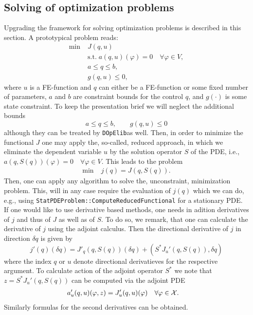 \documentclass[prodmode,acmtoms]{acmsmall}
\numberwithin{equation}{section}
\renewcommand{\phi}{\varphi}
\newcommand{\dope}{\texttt{DOpElib}}
\begin{document}
\subsection{Solving of optimization problems}\label{sec:opt}
Upgrading the framework for solving optimization problems
is described in this section. A prototypical problem reads:
\begin{align*}
\min\;&J(q,u) \\
  &\text{s.t.}\; a(q,u)(\phi) = 0 \quad \forall \phi\in V,\\
  &a \le q \le b,\\
  &g(q,u) \le 0,  
\end{align*}
where $u$ is a FE-function and $q$ can either be a FE-function or some 
fixed number of parameters, $a$ and $b$ are constraint bounds for the control $q$,
and $g(\cdot)$ is some state constraint.
To keep the presentation brief we will neglect the additional bounds
\[
a \le q \le b,\qquad g(q,u) \le 0
\]
although they can be treated by \dope as well.
Then, in order to minimize the functional $J$ one may apply the, so-called, 
reduced approach, in which we eliminate the dependent variable $u$ by the solution 
operator $S$ of the PDE, i.e., $a(q,S(q))(\phi) = 0 \quad \forall \phi\in V$. 
This leads to the problem
\begin{align*}
\min\;&j(q) = J(q,S(q)). 
\end{align*}
Then, one can apply any algorithm to solve the, unconstraint, minimization 
problem. This, will in any case require the evaluation of $j(q)$ which 
we can do, e.g., using \texttt{StatPDEProblem::ComputeReducedFunctional} for 
a stationary PDE. If one would like to use derivative based methods, one 
needs in adition derivatives of $j$ and thus of $J$ as well as of $S$. 
To do so, we remark, that one can calculate the derivative of 
$j$ using the adjoint calculus. Then the directional derivative 
of $j$ in direction $\delta q$ is given by
\[
j'(q)(\delta q) = J'_q(q,S(q))(\delta q) + (S^* J_u'(q,S(q)),\delta q)
\]
where the index $q$ or $u$ denote directional derivatieves for the 
respective argument. To calculate action of the adjoint operator $S^*$ 
we note that $z =  S^* J_u'(q,S(q))$
can be computed via the adjoint PDE
\begin{equation}
  \label{opt_KKT_system}
  \begin{aligned}
    a_{u}'(q,u)(\phi , z) &= J'_{u}(q,u)(\phi) & \forall \phi&\in {\cal X}.
  \end{aligned}
\end{equation}
Similarly formulas for the second derivatives can be obtained.
\end{document}
